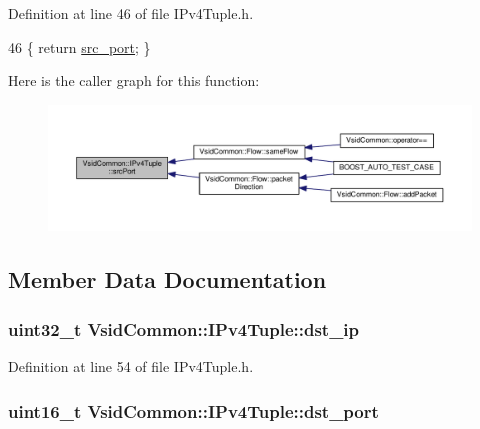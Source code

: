 Definition at line 46 of file I\-Pv4\-Tuple.\-h.


\begin{DoxyCode}
46 \{ \textcolor{keywordflow}{return} \hyperlink{class_vsid_common_1_1_i_pv4_tuple_a68b8ec74e1abb0d15ba66c48837a1662}{src\_port}; \} 
\end{DoxyCode}


Here is the caller graph for this function\-:
\nopagebreak
\begin{figure}[H]
\begin{center}
\leavevmode
\includegraphics[width=350pt]{class_vsid_common_1_1_i_pv4_tuple_a4092c3bd8281c8f5a8972c5c6c6f4bac_icgraph}
\end{center}
\end{figure}




\subsection{Member Data Documentation}
\hypertarget{class_vsid_common_1_1_i_pv4_tuple_a21ace381c0b90771659095178d0f15af}{
\subsubsection[{dst\-\_\-ip}]{\setlength{\rightskip}{0pt plus 5cm}uint32\-\_\-t Vsid\-Common\-::\-I\-Pv4\-Tuple\-::dst\-\_\-ip}}\label{class_vsid_common_1_1_i_pv4_tuple_a21ace381c0b90771659095178d0f15af}


Definition at line 54 of file I\-Pv4\-Tuple.\-h.

\hypertarget{class_vsid_common_1_1_i_pv4_tuple_a1c1d101406314b12ce43cc1d54177736}{
\subsubsection[{dst\-\_\-port}]{\setlength{\rightskip}{0pt plus 5cm}uint16\-\_\-t Vsid\-Common\-::\-I\-Pv4\-Tuple\-::dst\-\_\-port}}\label{class_vsid_common_1_1_i_pv4_tuple_a1c1d101406314b12ce43cc1d54177736}



